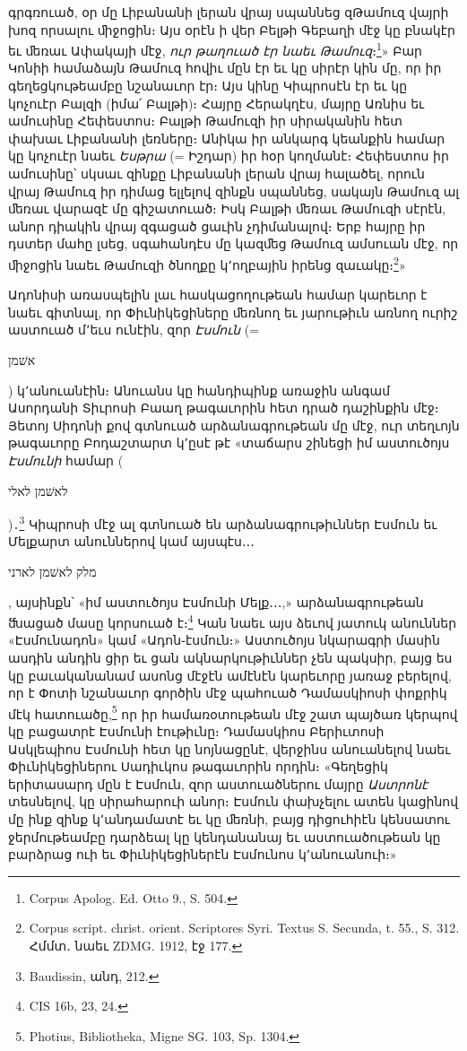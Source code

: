 \documentclass{article}
\begin{document}
{գրգռուած, օր մը Լիբանանի լերան վրայ սպաննեց զԹամուզ վայրի խոզ որսալու ﬕջոցին։ Այս օրէն ի վեր Բելթի Գեբաղի մէջ կը բնակէր եւ ﬔռաւ Ափակայի մէջ, \emph{ուր թաղուած էր նաեւ Թամուզ}։\footnote{Corpus Apolog. Ed. Otto 9., S. 504.}» Բար Կոնիի համաձայն Թամուզ հովիւ մըն էր եւ կը սիրէր կին մը, որ իր գեղեցկութեամբը նշանաւոր էր։ Այս կինը Կիպրոսէն էր եւ կը կոչուէր Բալզի (իմա՛ Բալթի)։ Հայրը Հերակղէս, մայրը Առնիս եւ ամուսինը Հեփեստոս։ Բալթի Թամուզի իր սիրականին հետ փախաւ Լիբանանի լեռները։ Անիկա իր անկարգ կեանքին համար կը կոչուէր նաեւ \emph{Եսթրա} (= Իշդար) իր հօր կողմանէ։ Հեփեստոս իր ամուսինը՝ սկսաւ զինքը Լիբանանի լերան վրայ հալածել, որուն վրայ Թամուզ իր դիմաց ելլելով զինքն սպաննեց, սակայն Թամուզ ալ ﬔռաւ վարազէ մը գիշատուած։ Իսկ Բալթի ﬔռաւ Թամուզի սէրէն, անոր դիակին վրայ զգացած ցաւին չդիմանալով։ Երբ հայրը իր դստեր մահը լսեց, սգահանդէս մը կազﬔց Թամուզ ամսուան մէջ, որ ﬕջոցին նաեւ Թամուզի ծնողքը կ՚ողբային իրենց զաւակը։\footnote{Corpus script. christ. orient. Scriptores Syri. Textus S. Secunda, t. 55., S. 312. Հմմտ․ նաեւ ZDMG. 1912, էջ 177.}»

Ադոնիսի առասպելին լաւ հասկացողութեան համար կարեւոր է նաեւ գիտնալ, որ Փիւնիկեցիները ﬔռնող եւ յարութիւն առնող ուրիշ աստուած մ՚եւս ունէին, զոր \emph{Էսմուն} (= \begin{hebrewfont}אשׁמן\end{hebrewfont}) կ՚անուանէին։ Անուանս կը հանդիպինք առաջին անգամ Ասորդանի Տիւրոսի Բաաղ թագաւորին հետ դրած դաշինքին մէջ։ Յետոյ Սիդոնի քով գտնուած արձանագրութեան մը մէջ, ուր տեղւոյն թագաւորը Բոդաշտարտ կ՚ըսէ թէ «տաճարս շինեցի իմ աստուծոյս \emph{Էսմունի} համար (\begin{hebrewfont}לאשׁמן לאלי\end{hebrewfont})․\footnote{Baudissin, անդ, 212.} Կիպրոսի մէջ ալ գտնուած են արձանագրութիւններ Էսմուն եւ Մելքարտ անուններով կամ այսպէս․․․ \begin{hebrewfont}מלק לאשׁמן לארני\end{hebrewfont}, այսինքն՝ «իմ աստուծոյս Էսմունի Մելք․․․,» արձանագրութեան ﬓացած մասը կորսուած է։\footnote{CIS 16b, 23, 24.} Կան նաեւ այս ձեւով յատուկ անուններ «Էսմունադոն» կամ «Ադոն֊էսմուն։» Աստուծոյս նկարագրի մասին ասդին անդին ցիր եւ ցան ակնարկութիւններ չեն պակսիր, բայց ես կը բաւականանամ ասոնց մէջէն ամէնէն կարեւորը յառաջ բերելով, որ է Փոտի նշանաւոր գործին մէջ պահուած Դամասկիոսի փոքրիկ մէկ հատուածը,\footnote{Photius, Bibliotheka, Migne SG. 103, Sp. 1304.} որ իր համառօտութեան մէջ շատ պայծառ կերպով կը բացատրէ Էսմունի էութիւնը։ Դամասկիոս Բերիւտոսի Ասկլեպիոս Էսմունի հետ կը նոյնացընէ, վերջինս անուանելով նաեւ Փիւնիկեցիներու Սադիւկոս թագաւորին որդին։ «Գեղեցիկ երիտասարդ մըն է Էսմուն, զոր աստուածներու մայրը \emph{Աստրոնէ} տեսնելով, կը սիրահարուի անոր։ Էսմուն փախչելու ատեն կացինով մը ինք զինք կ՚անդամատէ եւ կը ﬔռնի, բայց դիցուհիէն կենսատու ջերմութեամբը դարձեալ կը կենդանանայ եւ աստուածութեան կը բարձրաց ուի եւ Փիւնիկեցիներէն Էսմունոս կ՚անուանուի։»

}
\end{document}
